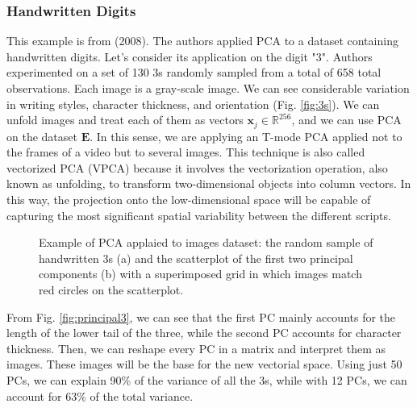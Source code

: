 \subsubsection{Handwritten Digits}
This example is  from \citeauthor{tibshirani_elements_2008} (2008).
The authors applied PCA to a dataset containing handwritten digits. Let's consider its application on the digit "3". Authors experimented on a set of 130 3s randomly sampled from a total of 658 total observations. Each image is a  gray-scale image. We can see considerable variation in writing styles, character thickness, and orientation (Fig. \ref{fig:3s}). We can unfold images and treat each of them as vectors $\textbf{x}_j \in \mathbb{R}^{256}$, and we can use PCA on the dataset $\mathbf{E}$. In this sense, we are applying an T-mode PCA applied not to the frames of a video but to several images. This technique is also called vectorized PCA (VPCA) because it involves the vectorization operation, also known as unfolding, to transform two-dimensional objects into column vectors. In this way, the projection onto the low-dimensional space will be capable of capturing the most significant spatial variability between the different scripts.
\begin{figure}
    \centering
    \quad
    \caption[Example of PCA of images.]{Example of PCA applaied to images dataset: the random sample of handwritten 3s (a) and the scatterplot of the first two principal components (b) with a superimposed grid in which images match red circles on the scatterplot\cite{tibshirani_elements_2008}.}
\end{figure}
From Fig. \ref{fig:principal3}, we can see that the first PC mainly accounts for the length of the lower tail of the three, while the second PC accounts for character thickness. Then, we can reshape every PC in a matrix and interpret them as images. These images will be the base for the new vectorial space. Using just 50 PCs, we can explain 90\% of the variance of all the 3s, while with 12 PCs, we can account for 63\% of the total variance.


